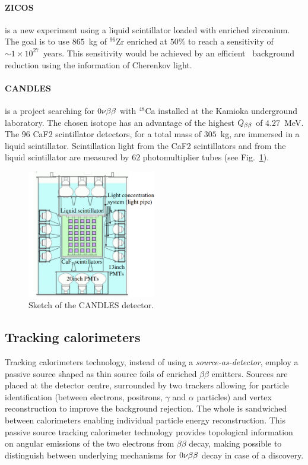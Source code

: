 \paragraph{ZICOS} is a new experiment using a liquid scintillator loaded with enriched zirconium.
The goal is to use $865$~kg of $^{96}$Zr enriched at $50$\% to reach a sensitivity of $\sim 1\times 10^{27}$~years.
This sensitivity would be achieved by an efficient \Tl\ background reduction using the information of Cherenkov light.

\paragraph{CANDLES} is a project searching for $0\nu\beta\beta$ with $^{48}$Ca installed at the Kamioka underground laboratory.
The chosen isotope has an advantage of the highest $Q_{\beta\beta}$ of $4.27$~MeV.
The $96$ CaF2 scintillator detectors, for a total mass of $305$~kg, are immersed in a liquid scintillator.
Scintillation light from the CaF2 scintillators and from the liquid scintillator are measured by $62$ photomultiplier tubes (see Fig.~\ref{fig:CANDLES}).

\begin{figure}
  \centering
  \includegraphics[width=0.5\textwidth]{neutrinophysics/fig_neutrinophysics/CANDLES.pdf}
  \caption{Sketch of the CANDLES detector.
    \label{fig:CANDLES}}
\end{figure}


\subsection{Tracking calorimeters}
\label{subsec:trackocalo}
Tracking calorimeters technology, instead of using a \emph{source-as-detector}, employ a passive source shaped as thin source foils of enriched $\beta\beta$ emitters.
Sources are placed at the detector centre, surrounded by two trackers allowing for particle identification (between electrons, positrons, $\gamma$ and $\alpha$ particles) and vertex reconstruction to improve the background rejection.
The whole is sandwiched between calorimeters enabling individual particle energy reconstruction.
This passive source tracking calorimeter technology provides topological information on angular emissions of the two electrons from $\beta\beta$ decay, making possible to distinguish between underlying mechanisms for $0\nu\beta\beta$ decay in case of a discovery.

